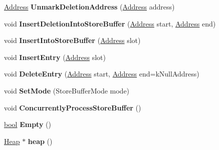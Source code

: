 \begin{DoxyCompactItemize}
\item 
\mbox{\label{classv8_1_1internal_1_1StoreBuffer_a3db69117be0eb51cde0ee86499802973}} 
\mbox{\hyperlink{classuintptr__t}{Address}} {\bfseries Unmark\+Deletion\+Address} (\mbox{\hyperlink{classuintptr__t}{Address}} address)
\item 
\mbox{\label{classv8_1_1internal_1_1StoreBuffer_ae5a4d25c5344bf220c843b81ed61800a}} 
void {\bfseries Insert\+Deletion\+Into\+Store\+Buffer} (\mbox{\hyperlink{classuintptr__t}{Address}} start, \mbox{\hyperlink{classuintptr__t}{Address}} end)
\item 
\mbox{\label{classv8_1_1internal_1_1StoreBuffer_a2a8b3c02571c7daa0585d172dc40e4df}} 
void {\bfseries Insert\+Into\+Store\+Buffer} (\mbox{\hyperlink{classuintptr__t}{Address}} slot)
\item 
\mbox{\label{classv8_1_1internal_1_1StoreBuffer_a12db6952201340f09180002753aa0fa7}} 
void {\bfseries Insert\+Entry} (\mbox{\hyperlink{classuintptr__t}{Address}} slot)
\item 
\mbox{\label{classv8_1_1internal_1_1StoreBuffer_a207d54b32397166e1b9dec9cb4f5749d}} 
void {\bfseries Delete\+Entry} (\mbox{\hyperlink{classuintptr__t}{Address}} start, \mbox{\hyperlink{classuintptr__t}{Address}} end=k\+Null\+Address)
\item 
\mbox{\label{classv8_1_1internal_1_1StoreBuffer_ac94dda4bf36c03e4016707b93f3a7ef9}} 
void {\bfseries Set\+Mode} (Store\+Buffer\+Mode mode)
\item 
\mbox{\label{classv8_1_1internal_1_1StoreBuffer_a5d468a72b32d9c9c4af95a106cdfc63e}} 
void {\bfseries Concurrently\+Process\+Store\+Buffer} ()
\item 
\mbox{\label{classv8_1_1internal_1_1StoreBuffer_a7d0196226a9e2946942b936f46224807}} 
\mbox{\hyperlink{classbool}{bool}} {\bfseries Empty} ()
\item 
\mbox{\label{classv8_1_1internal_1_1StoreBuffer_aa8a9ec53d70b867fe576e3bbc4367ae4}} 
\mbox{\hyperlink{classv8_1_1internal_1_1Heap}{Heap}} $\ast$ {\bfseries heap} ()
\end{DoxyCompactItemize}

